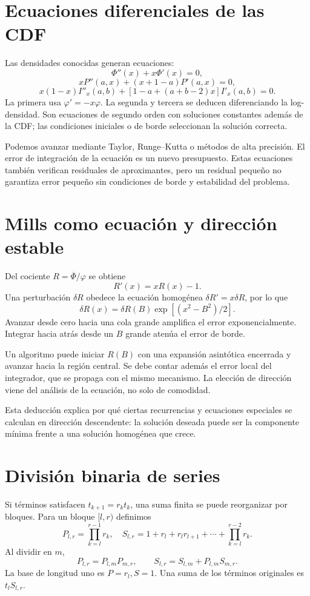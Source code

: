 \documentclass[11pt,a4paper]{article}
\theoremstyle{definition}
\newcommand{\ph}{\varphi}
\newcommand{\Q}{\overline\Phi}
\newcounter{problema}
\begin{document}
\section{Ecuaciones diferenciales de las CDF}
Las densidades conocidas generan ecuaciones:
\[
\Phi''(x)+x\Phi'(x)=0,
\]
\[
xP''(a,x)+(x+1-a)P'(a,x)=0,
\]
\[
x(1-x)I''_x(a,b)+[1-a+(a+b-2)x]I'_x(a,b)=0.
\]
La primera usa $\ph'=-x\ph$. La segunda y tercera se deducen diferenciando la log-densidad. Son ecuaciones de segundo orden con soluciones constantes además de la CDF; las condiciones iniciales o de borde seleccionan la solución correcta.

Podemos avanzar mediante Taylor, Runge--Kutta o métodos de alta precisión. El error de integración de la ecuación es un nuevo presupuesto. Estas ecuaciones también verifican residuales de aproximantes, pero un residual pequeño no garantiza error pequeño sin condiciones de borde y estabilidad del problema.

\section{Mills como ecuación y dirección estable}
Del cociente $R=\Q/\ph$ se obtiene
\[
R'(x)=xR(x)-1.
\]
Una perturbación $\delta R$ obedece la ecuación homogénea
$\delta R'=x\delta R$, por lo que
\[
\delta R(x)=\delta R(B)\exp[(x^2-B^2)/2].
\]
Avanzar desde cero hacia una cola grande amplifica el error exponencialmente. Integrar hacia atrás desde un $B$ grande atenúa el error de borde.

Un algoritmo puede iniciar $R(B)$ con una expansión asintótica encerrada y avanzar hacia la región central. Se debe contar además el error local del integrador, que se propaga con el mismo mecanismo. La elección de dirección viene del análisis de la ecuación, no solo de comodidad.

Esta deducción explica por qué ciertas recurrencias y ecuaciones especiales se calculan en dirección descendente: la solución deseada puede ser la componente mínima frente a una solución homogénea que crece.

\section{División binaria de series}
Si términos satisfacen $t_{k+1}=r_kt_k$, una suma finita se puede reorganizar por bloques. Para un bloque $[l,r)$ definimos
\[
P_{l,r}=\prod_{k=l}^{r-1}r_k,\quad
S_{l,r}=1+r_l+r_lr_{l+1}+\cdots+\prod_{k=l}^{r-2}r_k.
\]
Al dividir en $m$,
\[
P_{l,r}=P_{l,m}P_{m,r},\qquad
S_{l,r}=S_{l,m}+P_{l,m}S_{m,r}.
\]
La base de longitud uno es $P=r_l,S=1$. Una suma de los términos originales es $t_lS_{l,r}$.
\end{document}
